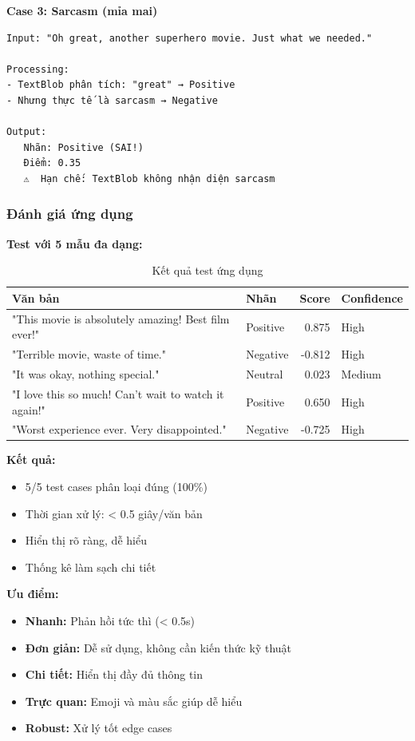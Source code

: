 \textbf{Case 3: Sarcasm (mỉa mai)}
\begin{verbatim}
Input: "Oh great, another superhero movie. Just what we needed."

Processing:
- TextBlob phân tích: "great" → Positive
- Nhưng thực tế là sarcasm → Negative

Output:
   Nhãn: Positive (SAI!)
   Điểm: 0.35
   ⚠️  Hạn chế: TextBlob không nhận diện sarcasm
\end{verbatim}

\subsubsection{Đánh giá ứng dụng}

\textbf{Test với 5 mẫu đa dạng:}
\begin{table}[H]
\centering
\caption{Kết quả test ứng dụng}
\begin{tabular}{|p{5cm}|l|r|l|}
\hline
\textbf{Văn bản} & \textbf{Nhãn} & \textbf{Score} & \textbf{Confidence} \\
\hline
"This movie is absolutely amazing! Best film ever!" & Positive & 0.875 & High \\
\hline
"Terrible movie, waste of time." & Negative & -0.812 & High \\
\hline
"It was okay, nothing special." & Neutral & 0.023 & Medium \\
\hline
"I love this so much! Can't wait to watch it again!" & Positive & 0.650 & High \\
\hline
"Worst experience ever. Very disappointed." & Negative & -0.725 & High \\
\hline
\end{tabular}
\end{table}

\textbf{Kết quả:}
\begin{itemize}
    \item 5/5 test cases phân loại đúng (100\%)
    \item Thời gian xử lý: < 0.5 giây/văn bản
    \item Hiển thị rõ ràng, dễ hiểu
    \item Thống kê làm sạch chi tiết
\end{itemize}

\textbf{Ưu điểm:}
\begin{itemize}
    \item \textbf{Nhanh:} Phản hồi tức thì (< 0.5s)
    \item \textbf{Đơn giản:} Dễ sử dụng, không cần kiến thức kỹ thuật
    \item \textbf{Chi tiết:} Hiển thị đầy đủ thông tin
    \item \textbf{Trực quan:} Emoji và màu sắc giúp dễ hiểu
    \item \textbf{Robust:} Xử lý tốt edge cases
\end{itemize}

